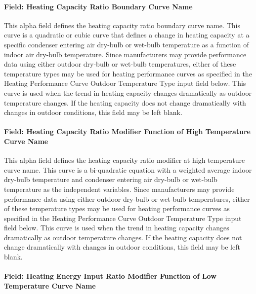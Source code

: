 \paragraph{Field: Heating Capacity Ratio Boundary Curve Name}\label{field-heating-capacity-ratio-boundary-curve-name}

This alpha field defines the heating capacity ratio boundary curve name. This curve is a quadratic or cubic curve that defines a change in heating capacity at a specific condenser entering air dry-bulb or wet-bulb temperature as a function of indoor air dry-bulb temperature. Since manufacturers may provide performance data using either outdoor dry-bulb or wet-bulb temperatures, either of these temperature types may be used for heating performance curves as specified in the Heating Performance Curve Outdoor Temperature Type input field below. This curve is used when the trend in heating capacity changes dramatically as outdoor temperature changes. If the heating capacity does not change dramatically with changes in outdoor conditions, this field may be left blank.

\paragraph{Field: Heating Capacity Ratio Modifier Function of High Temperature Curve Name}\label{field-heating-capacity-ratio-modifier-function-of-high-temperature-curve-name}

This alpha field defines the heating capacity ratio modifier at high temperature curve name. This curve is a bi-quadratic equation with a weighted average indoor dry-bulb temperature and condenser entering air dry-bulb or wet-bulb temperature as the independent variables. Since manufacturers may provide performance data using either outdoor dry-bulb or wet-bulb temperatures, either of these temperature types may be used for heating performance curves as specified in the Heating Performance Curve Outdoor Temperature Type input field below. This curve is used when the trend in heating capacity changes dramatically as outdoor temperature changes. If the heating capacity does not change dramatically with changes in outdoor conditions, this field may be left blank.

\paragraph{Field: Heating Energy Input Ratio Modifier Function of Low Temperature Curve Name}\label{field-heating-energy-input-ratio-modifier-function-of-low-temperature-curve-name}

